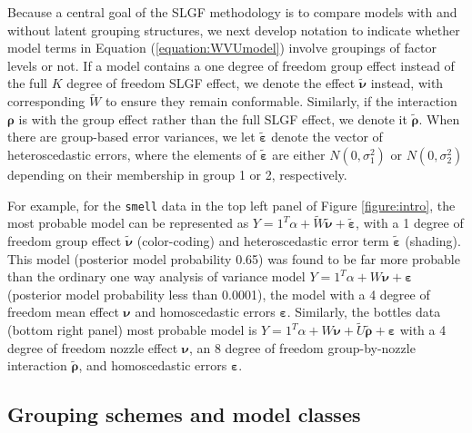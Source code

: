 Because a central goal of the SLGF methodology is to compare models with and without latent grouping structures, we next develop notation to indicate whether model terms in Equation (\ref{equation:WVUmodel}) involve groupings of factor levels or not. If a model contains a one degree of freedom group effect instead of the full $K$ degree of freedom SLGF effect, we denote the effect $\tilde{\boldsymbol{\nu}}$ instead, with corresponding $\tilde{W}$ to ensure they remain conformable. Similarly, if the interaction $\boldsymbol{\rho}$ is with the group effect rather than the full SLGF effect, we denote it $\tilde{\boldsymbol{\rho}}$. When there are group-based error variances, we let $\tilde{\boldsymbol{\varepsilon}}$ denote the vector of heteroscedastic errors, where the elements of $\tilde{\boldsymbol{\varepsilon}}$ are either $N(0,\sigma^2_1)$ or $N(0,\sigma^2_2)$ depending on their membership in group 1 or 2, respectively.

For example, for the \texttt{smell} data in the top left panel of Figure \ref{figure:intro}, the most probable model can be represented as $Y=1^T\alpha + \tilde{W}\tilde{\boldsymbol{\nu}}+\tilde{\boldsymbol{\varepsilon}}$, with a 1 degree of freedom group effect $\tilde{\boldsymbol{\nu}}$ (color-coding) and heteroscedastic error term $\tilde{\boldsymbol{\varepsilon}}$ (shading). This model (posterior model probability 0.65) was found to be far more probable than the ordinary one way analysis of variance model $Y=1^T\alpha + W{\boldsymbol{\nu}}+{\boldsymbol{\varepsilon}}$ (posterior model probability less than 0.0001), the model with a 4 degree of freedom mean effect ${\boldsymbol{\nu}}$ and homoscedastic errors ${\boldsymbol{\varepsilon}}$. Similarly, the bottles data (bottom right panel) most probable model is $Y=1^T\alpha + W{\boldsymbol{\nu}}+\tilde{U}\tilde{\boldsymbol{\rho}}+{\boldsymbol{\varepsilon}}$ with a 4 degree of freedom nozzle effect ${\boldsymbol{\nu}}$, an 8 degree of freedom group-by-nozzle interaction $\tilde{\boldsymbol{\rho}}$, and homoscedastic errors $\boldsymbol{\varepsilon}$. 

\subsection{Grouping schemes and model classes}\hypertarget{subsection:schemes}
{}


